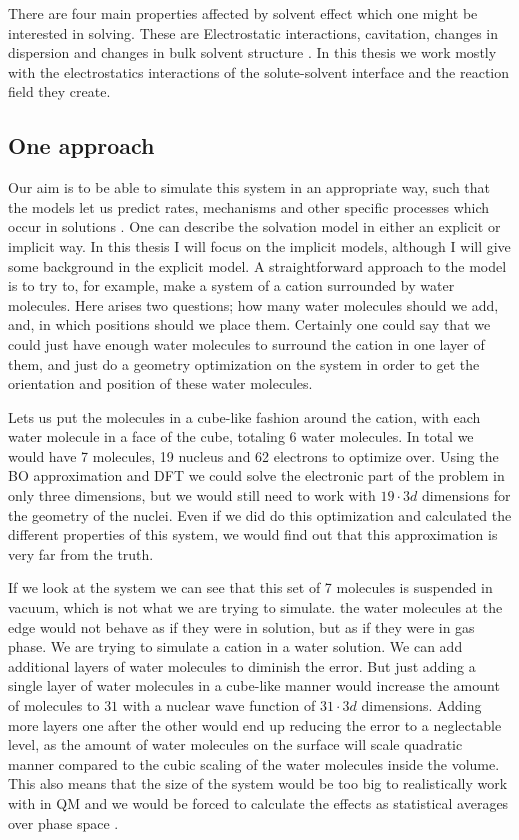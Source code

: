 \documentclass[../master_thesis.tex]{subfiles}
\begin{document}
There are four main properties affected by solvent effect which one might be
interested in solving. These are Electrostatic interactions, cavitation,
changes in dispersion and changes in bulk solvent structure \cite{Cramer:2004}.
In this thesis we work mostly with the electrostatics interactions of the
solute-solvent interface and the reaction field they create.

\subsection{One approach}
Our aim is to be able to simulate this system in an appropriate way, such that
the models let us predict rates, mechanisms and other specific processes which
occur in solutions \cite{Tomasi:1994wt}.
One can describe the solvation model in either an explicit or implicit way. In
this thesis I will focus on the implicit models, although I will give some
background in the explicit model.
A straightforward approach to the model is to try to, for example, make a
system of a  cation surrounded by water molecules. Here arises two
questions; how many water molecules should we add, and, in which positions
should we place them. Certainly one could say that we could just have enough
water molecules to surround the cation in one layer of them,  and just do a
geometry optimization \cite{Jensen:2017} on the system in order to get the
orientation and position of these water molecules.

Lets us put the molecules in a cube-like fashion around the cation, with each
water molecule in a face of the cube, totaling 6 water molecules. In total we
would have 7 molecules, 19 nucleus and 62 electrons to optimize over. Using the
\ac{BO} approximation and \ac{DFT} we could solve the electronic part of the
problem in only three dimensions, but we would still need to work with
$19\cdot3d$ dimensions for the geometry of the nuclei. Even if we did do this
optimization and calculated the different properties of this system, we would
find out that this approximation is very far from the truth.

If we look at the system we can see that this set of 7 molecules is suspended in
vacuum, which is not what we are trying to simulate. the water molecules at
the edge would not behave as if they were in solution, but as if they were in
gas phase. We are trying to simulate a  cation in a water solution.
We can add additional layers of water molecules to diminish the error. But
just adding a single layer of water molecules in a cube-like manner would
increase the amount of molecules to $31$ with a nuclear wave function of
$31\cdot3d$ dimensions. Adding more layers one after the other would end up
reducing the error to a neglectable level, as the amount of water molecules on
the surface will scale quadratic manner compared to the cubic scaling of the
water molecules inside the volume. This also means that the size of the system
would be too big to realistically work with in \ac{QM} and we would be forced to
calculate the effects as statistical averages over phase space
\cite{Cramer:2004}.
\end{document}
